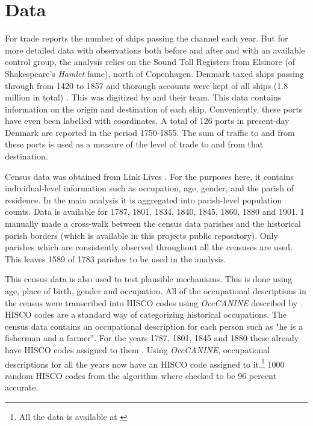 \documentclass[11pt]{article}
\begin{document}
\section{Data}
For trade \cite{Svalgaard1977} reports the number of ships passing the channel each year. But for more detailed data with observations both before and after and with an available control group, the analysis relies on the Sound Toll Registers from Elsinore (of Shakespeare's \textit{Hamlet} fame), north of Copenhagen. Denmark taxed ships passing through from 1420 to 1857 and thorough accounts were kept of all ships (1.8 million in total) \citep{gobel2010oresundstolden}. This was digitized by \cite{soundtoll_data} and their team. This data contains information on the origin and destination of each ship. Conveniently, these ports have even been labelled with coordinates. A total of 126 ports in present-day Denmark are reported in the period 1750-1855. The sum of traffic to and from these ports is used as a measure of the level of trade to and from that destination. 

Census data was obtained from Link Lives \citep{mathiesen2022linklives}. For the purposes here, it contains individual-level information such as occupation, age, gender, and the parish of residence. In the main analysis it is aggregated into parish-level population counts. Data is available for 1787, 1801, 1834, 1840, 1845, 1860, 1880 and 1901. I manually made a cross-walk between the census data parishes and the historical parish borders (which is available in this projects public repository). Only parishes which are consistently observed throughout all the censuses are used. This leaves 1589 of 1783 parishes to be used in the analysis. 

This census data is also used to test plausible mechanisms. This is done using age, place of birth, gender and occupation. All of the occupational descriptions in the census were transcribed into HISCO codes using \textit{OccCANINE} described by \cite{dahl2024breaking}. HISCO codes are a standard way of categorizing historical occupations. The census data contains an occupational description for each person such as "he is a fisherman and a farmer". For the years 1787, 1801, 1845 and 1880 these already have HISCO codes assigned to them \citep{ddd_method2015}. Using \textit{OccCANINE}, occupational descriptions for all the years now have an HISCO code assigned to it.\footnote{All the data is available at \cite{dk_hisco_data}} 1000 random HISCO codes from the algorithm where checked to be 96 percent accurate. 
\end{document}
